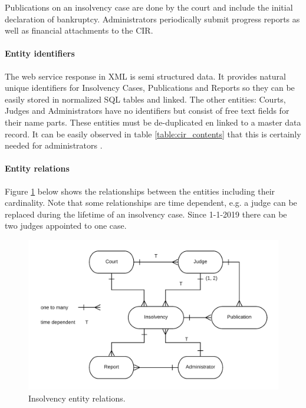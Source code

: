 Publications on an insolvency case are done by the court and include the initial declaration of bankruptcy. Administrators periodically submit progress reports as well as financial attachments to the CIR.

\paragraph{Entity identifiers}
The web service response in XML is semi structured data. It provides natural unique identifiers for Insolvency Cases, Publications and Reports	so they can be easily stored in normalized SQL tables and linked. The other entities: Courts, Judges and Administrators have no identifiers but consist of free text fields for their name parts. These entities must be de-duplicated en linked to a master data record. It can be easily observed in table \ref{table:cir_contents} that this is certainly needed for administrators .

\paragraph{Entity relations}
Figure \ref{fig:cir-erd} below shows the relationships between the entities including their cardinality. Note that some relationships are time dependent, e.g. a judge can be replaced during the lifetime of an insolvency case. Since 1-1-2019 there can be two judges appointed to one case.

\begin{figure}[h]
	\includegraphics[width=1\linewidth]{images/cir_erd_2.png}
	\caption{Insolvency entity relations.}
	\label{fig:cir-erd}
\end{figure}

